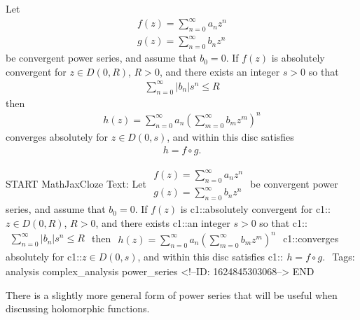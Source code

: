 \documentclass{memoir}
\begin{document}
\begin{prop}
	Let
	\begin{align*}
		f(z) = \sum_{n=0}^{\infty} a_n z^{n}\\
		g(z) = \sum_{n=0}^{\infty} b_n z^{n}
	\end{align*}
	be convergent power series, and assume that \(b_0 = 0\). If \(f(z)\) is absolutely convergent for \(z \in D(0,R)\), \(R>0\), and there exists an integer \(s>0\) so that
	\begin{align*}
		\sum_{n=0}^{\infty} \left| b_n \right| s^{n} \leq R
	\end{align*}
	then
	\begin{align*}
		h(z) = \sum_{n=0}^{\infty} a_n \left( \sum_{m=0}^{\infty} b_m z^{m} \right)^{n}
	\end{align*}
	converges absolutely for \(z \in D(0,s)\), and within this disc satisfies
	\begin{align*}
		h = f\circ g.
	\end{align*}
\end{prop}

\begin{anki}
START
MathJaxCloze
Text: Let
\(\begin{align*}
  	f(z) = \sum_{n=0}^{\infty} a_n z^{n}\\
  	g(z) = \sum_{n=0}^{\infty} b_n z^{n}
  \end{align*}\)
be convergent power series, and assume that \(b_0 = 0\). If \(f(z)\) is {{c1::absolutely convergent}} for {{c1::\(z \in D(0,R)\)}}, \(R>0\), and there exists {{c1::an integer \(s>0\)}} so that
{{c1::\(\begin{align*}
        	\sum_{n=0}^{\infty} \left| b_n \right| s^{n} \leq R
        \end{align*}\)}} 
then
\(\begin{align*}
  	h(z) = \sum_{n=0}^{\infty} a_n \left( \sum_{m=0}^{\infty} b_m z^{m} \right)^{n}
  \end{align*}\)
{{c1::converges absolutely}} for {{c1::\(z \in D(0,s)\)}}, and within this disc satisfies
{{c1::\(\begin{align*}
        	h = f\circ g.
        \end{align*}\)}} 
Tags: analysis complex_analysis power_series
<!--ID: 1624845303068-->
END
\end{anki}

There is a slightly more general form of power series that will be useful when discussing holomorphic functions.
\end{document}
